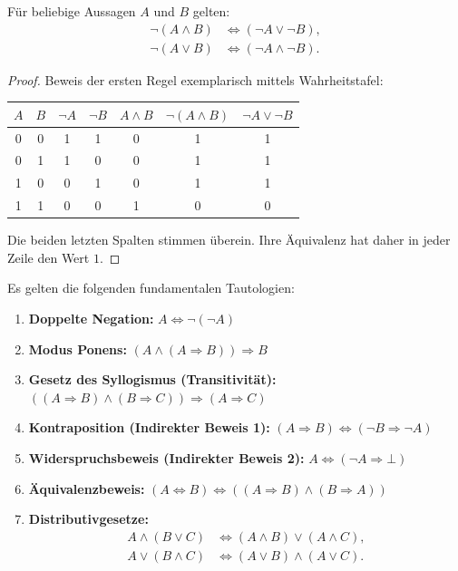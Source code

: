 \begin{satz}
Für beliebige Aussagen $A$ und $B$ gelten:
\begin{align*}
    \neg(A \land B) &\Longleftrightarrow (\neg A \lor \neg B), \\
    \neg(A \lor B) &\Longleftrightarrow (\neg A \land \neg B).
\end{align*}
\end{satz}

\begin{proof}
Beweis der ersten Regel exemplarisch mittels Wahrheitstafel:
\begin{center}
\renewcommand{\arraystretch}{1.15}
\begin{tabular}{ccccccc}
    \toprule
    $A$ & $B$ & $\neg A$ & $\neg B$ & $A \land B$ & $\neg(A \land B)$ & $\neg A \lor \neg B$ \\
    \midrule
    0 & 0 & 1 & 1 & 0 & 1 & 1 \\
    0 & 1 & 1 & 0 & 0 & 1 & 1 \\
    1 & 0 & 0 & 1 & 0 & 1 & 1 \\
    1 & 1 & 0 & 0 & 1 & 0 & 0 \\
    \bottomrule
\end{tabular}
\end{center}
Die beiden letzten Spalten stimmen überein. Ihre Äquivalenz hat daher in jeder Zeile den Wert $1$.
\end{proof}

\begin{satz}
Es gelten die folgenden fundamentalen Tautologien:
\begin{enumerate}
    \item \textbf{Doppelte Negation:} $A \Longleftrightarrow \neg(\neg A)$
    \item \textbf{Modus Ponens:} $(A \land (A \Rightarrow B)) \Longrightarrow B$
    \item \textbf{Gesetz des Syllogismus (Transitivität):} $((A \Rightarrow B) \land (B \Rightarrow C)) \Longrightarrow (A \Rightarrow C)$
    \item \textbf{Kontraposition (Indirekter Beweis 1):} $(A \Rightarrow B) \Longleftrightarrow (\neg B \Rightarrow \neg A)$
    \item \textbf{Widerspruchsbeweis (Indirekter Beweis 2):} $A \Longleftrightarrow (\neg A \Rightarrow \bot)$
    \item \textbf{Äquivalenzbeweis:} $(A \Leftrightarrow B) \Longleftrightarrow ((A \Rightarrow B) \land (B \Rightarrow A))$
    \item \textbf{Distributivgesetze:}
    \begin{align*}
        A \land (B \lor C) &\Longleftrightarrow (A \land B) \lor (A \land C), \\
        A \lor (B \land C) &\Longleftrightarrow (A \lor B) \land (A \lor C).
    \end{align*}
\end{enumerate}
\end{satz}

